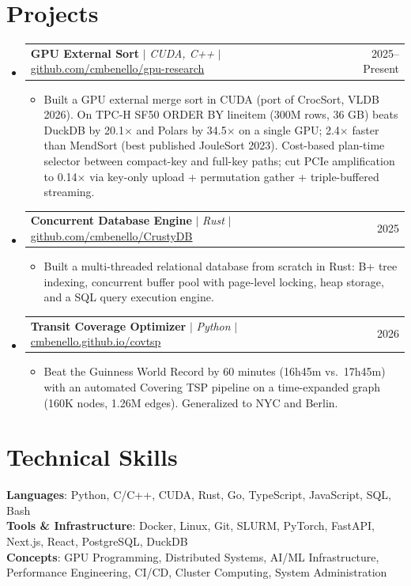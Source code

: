 \documentclass[letterpaper,10pt]{article}
\makeatletter
\newcommand{\resumeItem}[1]{
  \item\small{
    {#1 \vspace{-3pt}}
  }
}
\newcommand{\resumeProjectHeading}[2]{
    \item
    \begin{tabular*}{0.99\textwidth}{l@{\extracolsep{\fill}}r}
      \small#1 & #2 \\
    \end{tabular*}\vspace{-8pt}
}
\newcommand{\resumeSubHeadingListStart}{\begin{itemize}[leftmargin=0.015in, label={}]}
\newcommand{\resumeSubHeadingListEnd}{\end{itemize}}
\newcommand{\resumeItemListStart}{\begin{itemize}[leftmargin=0.15in]}
\newcommand{\resumeItemListEnd}{\end{itemize}\vspace{-7pt}}
\makeatother
\begin{document}
\section{Projects}
    \resumeSubHeadingListStart
      \resumeProjectHeading
          {\textbf{GPU External Sort} $|$ \emph{CUDA, C++} $|$ \small{\href{https://github.com/cmbenello/gpu-research}{github.com/cmbenello/gpu-research}}}{2025--Present}
          \resumeItemListStart
            \resumeItem{Built a GPU external merge sort in CUDA (port of CrocSort, VLDB 2026). On TPC-H SF50 ORDER BY lineitem (300M rows, 36 GB) beats DuckDB by 20.1$\times$ and Polars by 34.5$\times$ on a single GPU; 2.4$\times$ faster than MendSort (best published JouleSort 2023). Cost-based plan-time selector between compact-key and full-key paths; cut PCIe amplification to 0.14$\times$ via key-only upload + permutation gather + triple-buffered streaming.}
          \resumeItemListEnd
      \resumeProjectHeading
          {\textbf{Concurrent Database Engine} $|$ \emph{Rust} $|$ \small{\href{https://github.com/cmbenello/CrustyDB}{github.com/cmbenello/CrustyDB}}}{2025}
          \resumeItemListStart
            \resumeItem{Built a multi-threaded relational database from scratch in Rust: B+ tree indexing, concurrent buffer pool with page-level locking, heap storage, and a SQL query execution engine.}
          \resumeItemListEnd
      \resumeProjectHeading
          {\textbf{Transit Coverage Optimizer} $|$ \emph{Python} $|$ \small{\href{https://cmbenello.github.io/covtsp}{cmbenello.github.io/covtsp}}}{2026}
          \resumeItemListStart
            \resumeItem{Beat the Guinness World Record by 60 minutes (16h45m vs.\ 17h45m) with an automated Covering TSP pipeline on a time-expanded graph (160K nodes, 1.26M edges). Generalized to NYC and Berlin.}
          \resumeItemListEnd
    \resumeSubHeadingListEnd

\section{Technical Skills}
 \begin{itemize}[leftmargin=0.015in, label={}]
    \small{\item{
     \textbf{Languages}{: Python, C/C++, CUDA, Rust, Go, TypeScript, JavaScript, SQL, Bash} \\
     \textbf{Tools \& Infrastructure}{: Docker, Linux, Git, SLURM, PyTorch, FastAPI, Next.js, React, PostgreSQL, DuckDB} \\
     \textbf{Concepts}{: GPU Programming, Distributed Systems, AI/ML Infrastructure, Performance Engineering, CI/CD, Cluster Computing, System Administration}
    }}
 \end{itemize}\vspace{-9pt}
\end{document}
